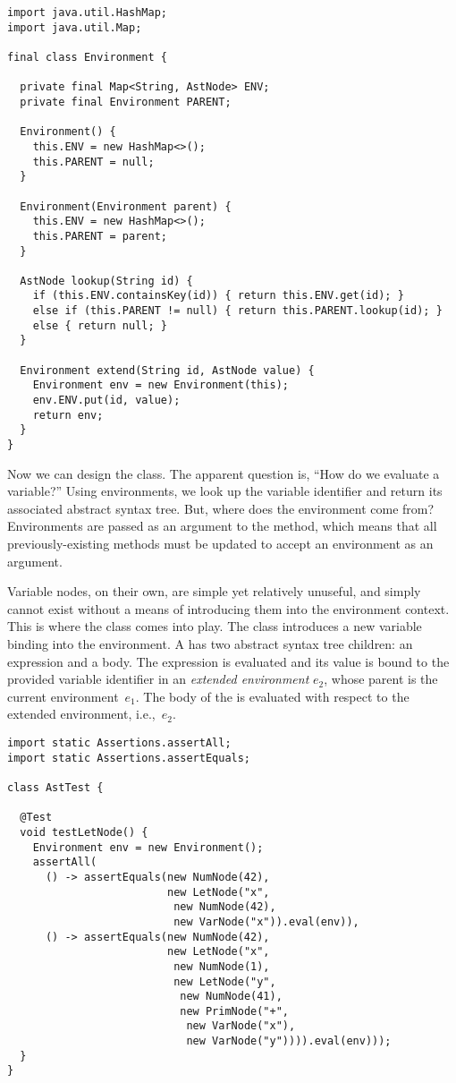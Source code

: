 \begin{lstlisting}[language=MyJava]
import java.util.HashMap;
import java.util.Map;

final class Environment {

  private final Map<String, AstNode> ENV;
  private final Environment PARENT;

  Environment() { 
    this.ENV = new HashMap<>(); 
    this.PARENT = null; 
  }

  Environment(Environment parent) { 
    this.ENV = new HashMap<>(); 
    this.PARENT = parent; 
  }

  AstNode lookup(String id) {
    if (this.ENV.containsKey(id)) { return this.ENV.get(id); }
    else if (this.PARENT != null) { return this.PARENT.lookup(id); }
    else { return null; }
  }

  Environment extend(String id, AstNode value) {
    Environment env = new Environment(this);
    env.ENV.put(id, value);
    return env;
  }
}
\end{lstlisting}

Now we can design the  class. 
The apparent question is, ``How do we evaluate a variable?'' 
Using environments, we look up the variable identifier and return its associated abstract syntax tree. 
But, where does the environment come from? 
Environments are passed as an argument to the  method, which means that all previously-existing  methods must be updated to accept an environment as an argument.

Variable nodes, on their own, are simple yet relatively unuseful, and simply cannot exist without a means of introducing them into the environment context. 
This is where the  class comes into play. 
The  class introduces a new variable binding into the environment. 
A  has two abstract syntax tree children: an expression and a body. The expression is evaluated and its value is bound to the provided variable identifier in an \emph{extended environment} $e_2$, whose parent is the current environment~$e_1$. The body of the  is evaluated with respect to the extended environment, i.e.,~$e_2$.

\begin{lstlisting}[language=MyJava]
import static Assertions.assertAll;
import static Assertions.assertEquals;

class AstTest {

  @Test
  void testLetNode() {
    Environment env = new Environment();
    assertAll(
      () -> assertEquals(new NumNode(42),
                         new LetNode("x", 
                          new NumNode(42),
                          new VarNode("x")).eval(env)),
      () -> assertEquals(new NumNode(42),
                         new LetNode("x", 
                          new NumNode(1),
                          new LetNode("y", 
                           new NumNode(41),
                           new PrimNode("+", 
                            new VarNode("x"), 
                            new VarNode("y")))).eval(env)));
  }
}
\end{lstlisting}

